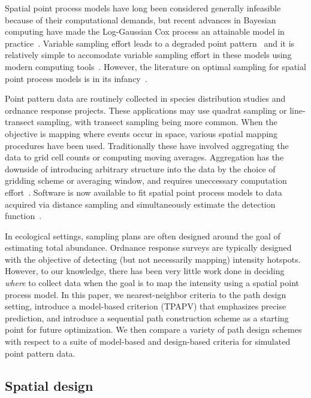 \documentclass[review]{elsarticle}
\begin{document}
Spatial point process models have long been considered generally infeasible
because of their computational demands, but recent advances in Bayesian
computing have made the Log-Gaussian Cox process an attainable model in
practice~\citep{rueetal, lindgrenetal, illianetal, simpsonetal}. Variable
sampling effort leads to a degraded point pattern~\cite{chakrabortyetal} and
it is relatively simple to accomodate variable sampling effort in these models
using modern computing tools~\citep{yuanetal}. However, the literature on
optimal sampling for spatial point process models is in its
infancy~\citep{liuvanhatalo}.

Point pattern data are routinely collected in species distribution studies and
ordnance response projects. These applications may use quadrat sampling or
line-transect sampling, with transect sampling being more common. When the
objective is mapping where events occur in space, various spatial mapping
procedures have been used. Traditionally these have involved aggregating the
data to grid cell counts or computing moving averages. Aggregation has the
downside of introducing arbitrary structure into the data by the choice of
gridding scheme or averaging window, and requires uneccessary computation
effort~\citep{simpsonetal}. Software is now available to fit spatial point
process models to data acquired via distance sampling and simultaneously
estimate the detection function~\citep{dspat,baser}.

In ecological settings, sampling plans are often designed around the goal of
estimating total abundance. Ordnance response surveys are typically designed
with the objective of detecting (but not necessarily mapping) intensity
hotspots. However, to our knowledge, there has been very little work done in
deciding \emph{where} to collect data when the goal is to map the intensity
using a spatial point process model. In this paper, we nearest-neighbor
criteria to the path design setting, introduce a model-based criterion (TPAPV)
that emphasizes precise prediction, and introduce a sequential path
construction scheme as a starting point for future optimization. We then
compare a variety of path design schemes with respect to a suite of model-based
and design-based criteria for simulated point pattern data.



\subsection{Spatial design}
\end{document}
